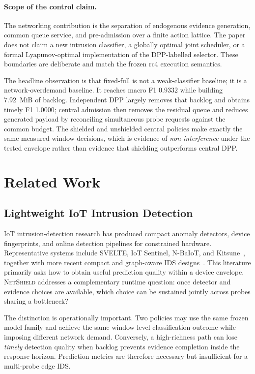 \documentclass[10pt,journal]{IEEEtran}
\newcommand{\NetShield}{\textsc{NetShield}}
\begin{document}
\paragraph{Scope of the control claim.} The networking contribution is the separation of endogenous evidence generation, common queue service, and pre-admission over a finite action lattice. The paper does not claim a new intrusion classifier, a globally optimal joint scheduler, or a formal Lyapunov-optimal implementation of the DPP-labelled selector. These boundaries are deliberate and match the frozen rc4 execution semantics.

The headline observation is that fixed-full is not a weak-classifier baseline; it is a network-overdemand baseline. It reaches macro F1 0.9332 while building 7.92~MiB of backlog. Independent DPP largely removes that backlog and obtains timely F1 1.0000; central admission then removes the residual queue and reduces generated payload by reconciling simultaneous probe requests against the common budget. The shielded and unshielded central policies make exactly the same measured-window decisions, which is evidence of \emph{non-interference} under the tested envelope rather than evidence that shielding outperforms central DPP.

\section{Related Work}
\subsection{Lightweight IoT Intrusion Detection}
IoT intrusion-detection research has produced compact anomaly detectors, device fingerprints, and online detection pipelines for constrained hardware. Representative systems include SVELTE, IoT Sentinel, N-BaIoT, and Kitsune~\cite{raza2013svelte,miettinen2017iotsentinel,meidan2018nbaiot,mirsky2018kitsune}, together with more recent compact and graph-aware IDS designs~\cite{wang2024hyperdetect,jiang2024graph,du2024fewshot}. This literature primarily asks how to obtain useful prediction quality within a device envelope. \NetShield{} addresses a complementary runtime question: once detector and evidence choices are available, which choice can be sustained jointly across probes sharing a bottleneck?

The distinction is operationally important. Two policies may use the same frozen model family and achieve the same window-level classification outcome while imposing different network demand. Conversely, a high-richness path can lose \emph{timely} detection quality when backlog prevents evidence completion inside the response horizon. Prediction metrics are therefore necessary but insufficient for a multi-probe edge IDS.
\end{document}
